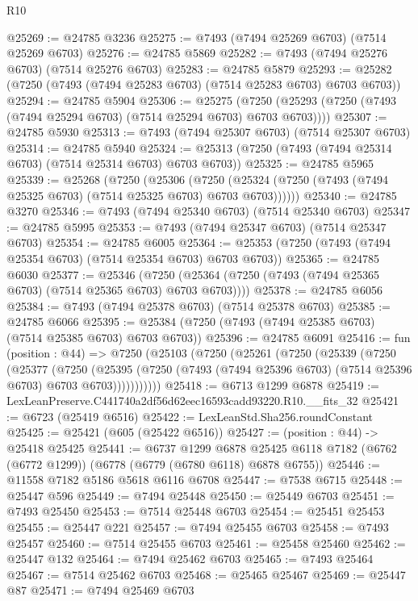 \begin{lexlean}{R10}
\begin{coremodule}
@25269 := @24785 @3236
@25275 := @7493 (@7494 @25269 @6703) (@7514 @25269 @6703)
@25276 := @24785 @5869
@25282 := @7493 (@7494 @25276 @6703) (@7514 @25276 @6703)
@25283 := @24785 @5879
@25293 := @25282 (@7250 (@7493 (@7494 @25283 @6703) (@7514 @25283 @6703) @6703 @6703))
@25294 := @24785 @5904
@25306 := @25275
    (@7250 (@25293 (@7250 (@7493 (@7494 @25294 @6703) (@7514 @25294 @6703) @6703 @6703))))
@25307 := @24785 @5930
@25313 := @7493 (@7494 @25307 @6703) (@7514 @25307 @6703)
@25314 := @24785 @5940
@25324 := @25313 (@7250 (@7493 (@7494 @25314 @6703) (@7514 @25314 @6703) @6703 @6703))
@25325 := @24785 @5965
@25339 := @25268
    (@7250
      (@25306
        (@7250 (@25324 (@7250 (@7493 (@7494 @25325 @6703) (@7514 @25325 @6703) @6703 @6703))))))
@25340 := @24785 @3270
@25346 := @7493 (@7494 @25340 @6703) (@7514 @25340 @6703)
@25347 := @24785 @5995
@25353 := @7493 (@7494 @25347 @6703) (@7514 @25347 @6703)
@25354 := @24785 @6005
@25364 := @25353 (@7250 (@7493 (@7494 @25354 @6703) (@7514 @25354 @6703) @6703 @6703))
@25365 := @24785 @6030
@25377 := @25346
    (@7250 (@25364 (@7250 (@7493 (@7494 @25365 @6703) (@7514 @25365 @6703) @6703 @6703))))
@25378 := @24785 @6056
@25384 := @7493 (@7494 @25378 @6703) (@7514 @25378 @6703)
@25385 := @24785 @6066
@25395 := @25384 (@7250 (@7493 (@7494 @25385 @6703) (@7514 @25385 @6703) @6703 @6703))
@25396 := @24785 @6091
@25416 := fun (position : @44) =>
  @7250
    (@25103
      (@7250
        (@25261
          (@7250
            (@25339
              (@7250
                (@25377
                  (@7250
                    (@25395
                      (@7250 (@7493 (@7494 @25396 @6703) (@7514 @25396 @6703) @6703 @6703)))))))))))
@25418 := @6713 @1299 @6878
@25419 := LexLeanPreserve.C441740a2df56d62eec16593cadd93220.R10.__fits_32
@25421 := @6723 (@25419 @6516)
@25422 := LexLeanStd.Sha256.roundConstant
@25425 := @25421 (@605 (@25422 @6516))
@25427 := (position : @44) -> @25418 @25425
@25441 := @6737
    @1299
    @6878
    @25425
    @6118
    @7182
    (@6762 (@6772 @1299))
    (@6778 (@6779 (@6780 @6118) @6878 @6755))
@25446 := @11558 @7182 @5186 @5618 @6116 @6708
@25447 := @7538 @6715
@25448 := @25447 @596
@25449 := @7494 @25448
@25450 := @25449 @6703
@25451 := @7493 @25450
@25453 := @7514 @25448 @6703
@25454 := @25451 @25453
@25455 := @25447 @221
@25457 := @7494 @25455 @6703
@25458 := @7493 @25457
@25460 := @7514 @25455 @6703
@25461 := @25458 @25460
@25462 := @25447 @132
@25464 := @7494 @25462 @6703
@25465 := @7493 @25464
@25467 := @7514 @25462 @6703
@25468 := @25465 @25467
@25469 := @25447 @87
@25471 := @7494 @25469 @6703

\end{coremodule}
\end{lexlean}
